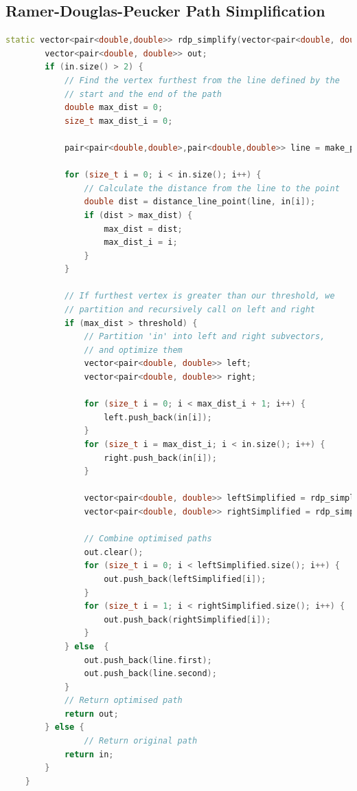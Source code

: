 \documentclass[titlepage,12pt,a4paper]{article}
\begin{document}
\subsection{Ramer-Douglas-Peucker Path Simplification}
\begin{lstlisting}[language=C++]
	static vector<pair<double,double>> rdp_simplify(vector<pair<double, double>> in, double threshold) {
        vector<pair<double, double>> out;
        if (in.size() > 2) {
            // Find the vertex furthest from the line defined by the
            // start and the end of the path
            double max_dist = 0;
            size_t max_dist_i = 0;      

            pair<pair<double,double>,pair<double,double>> line = make_pair(in.front(), in.back());
    
            for (size_t i = 0; i < in.size(); i++) {
            	// Calculate the distance from the line to the point
                double dist = distance_line_point(line, in[i]);
                if (dist > max_dist) {
                    max_dist = dist;
                    max_dist_i = i;
                }
            }

            // If furthest vertex is greater than our threshold, we
            // partition and recursively call on left and right
            if (max_dist > threshold) {
                // Partition 'in' into left and right subvectors,
                // and optimize them
                vector<pair<double, double>> left;
                vector<pair<double, double>> right;
                
                for (size_t i = 0; i < max_dist_i + 1; i++) {
                    left.push_back(in[i]);
                }
                for (size_t i = max_dist_i; i < in.size(); i++) { 
                    right.push_back(in[i]);
                }
	
                vector<pair<double, double>> leftSimplified = rdp_simplify(left, threshold);
                vector<pair<double, double>> rightSimplified = rdp_simplify(right, threshold);

                // Combine optimised paths
                out.clear();
                for (size_t i = 0; i < leftSimplified.size(); i++) {
                    out.push_back(leftSimplified[i]);
                }
                for (size_t i = 1; i < rightSimplified.size(); i++) {
                    out.push_back(rightSimplified[i]);
                }
            } else  {
                out.push_back(line.first);
                out.push_back(line.second);
            }
            // Return optimised path
            return out;
        } else {
        	    // Return original path
            return in;
        }
    }    
\end{lstlisting}
\end{document}
